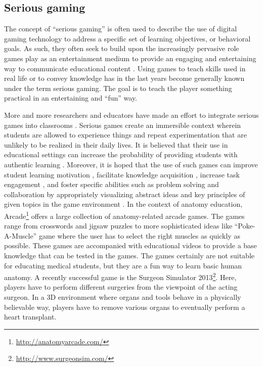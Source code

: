 \subsection{Serious gaming}
The concept of ``serious gaming'' is often used to describe the use of digital gaming technology to address a specific set of learning objectives, or behavioral goals. As such, they often seek to build upon the increasingly pervasive role games play as an entertainment medium to provide an engaging and entertaining way to communicate educational content \cite{Schuller2013a}. 
Using games to teach skills used in real life or to convey knowledge has in the last years become generally known under the term serious gaming. The goal is to teach the player something practical in an entertaining and ``fun'' way.

More and more researchers and educators have made an effort to integrate serious games into classrooms \cite{Connolly2012}. Serious games create an immersible context wherein students are allowed to experience things and repeat experimentation that are unlikely to be realized in their daily lives. It is believed that their use in educational settings can increase the probability of providing students with authentic learning \cite{Cheng2012}. Moreover, it is hoped that the use of such games can improve student learning motivation \cite{Papastergiou2009}, facilitate knowledge acquisition \cite{Miller2011}, increase task engagement \cite{Annetta2009}, and foster specific abilities such as problem solving and collaboration \cite{Sanchez2011} by appropriately visualizing abstract ideas and key principles of given topics in the game environment \cite{Cheng2015}. 
In the context of anatomy education, Arcade\footnote{\url{http://anatomyarcade.com/}} offers a large collection of anatomy-related arcade games. The games range from crosswords and jigsaw puzzles to more sophisticated ideas like ``Poke-A-Muscle'' game where the user has to select the right muscles as quickly as possible. These games are accompanied with educational videos to provide a base knowledge that can be tested in the games. The games certainly are not suitable for educating medical students, but they are a fun way to learn basic human anatomy.
A recently successful game is the Surgeon Simulator 2013\footnote{\url{http://www.surgeonsim.com/}}. Here, players have to perform different surgeries from the viewpoint of the acting surgeon. In a 3D environment where organs and tools behave in a physically believable way, players have to remove various organs to eventually perform a heart transplant. %
